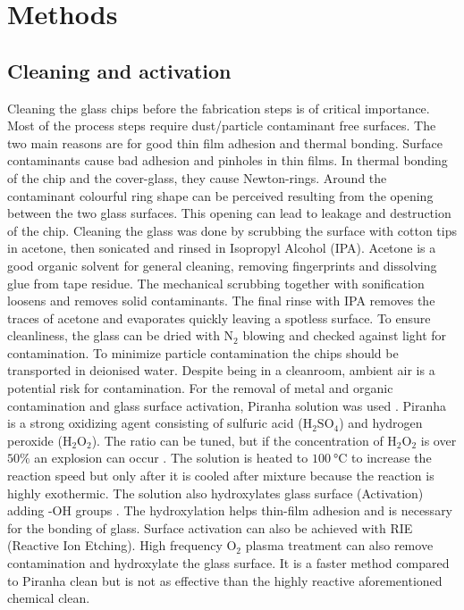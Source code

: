 \documentclass[final]{jyflluk}
\begin{document}
\section{Methods}
\label{sec:methods}

\subsection{Cleaning and activation}
\label{sec:xx1}

Cleaning the glass chips before the fabrication steps is of critical importance. Most of the process steps require dust/particle contaminant free surfaces. The two main reasons are for good thin film adhesion and thermal bonding. Surface contaminants cause bad adhesion and pinholes in thin films. In thermal bonding of the chip and the cover-glass, they cause Newton-rings. Around the contaminant colourful ring shape can be perceived resulting from the opening between the two glass surfaces. This opening can lead to leakage and destruction of the chip.
Cleaning the glass was done by scrubbing the surface with cotton tips in acetone, then sonicated and rinsed in Isopropyl Alcohol (IPA). Acetone is a good organic solvent for general cleaning, removing fingerprints and dissolving glue from tape residue. The mechanical scrubbing together with sonification loosens and removes solid contaminants. The final rinse with IPA removes the traces of acetone and evaporates quickly leaving a spotless surface. To ensure cleanliness, the glass can be dried with $\mathrm{N_2}$ blowing and checked against light for contamination.  To minimize particle contamination the chips should be transported in deionised water. Despite being in a cleanroom, ambient air is a potential risk for contamination. 
For the removal of metal and organic contamination and glass surface activation, Piranha solution was used \cite{franssila2010introduction}. Piranha is a strong oxidizing agent consisting of sulfuric acid ($\mathrm{H_2 SO_4}$) and hydrogen peroxide ($\mathrm{H_2 O_2}$). The ratio can be tuned, but if the concentration of $\mathrm{H_2 O_2}$ is over $50 \percent$ an explosion can occur \cite{piranha2014}. The solution is heated to $\SI{100}{\celsius}$ to increase the reaction speed but only after it is cooled after mixture because the reaction is highly exothermic. The solution also hydroxylates glass surface (Activation) adding -OH groups \cite{klug2013chemical}. The hydroxylation helps thin-film adhesion and is necessary for the bonding of glass. Surface activation can also be achieved with RIE (Reactive Ion Etching)\cite{lazauskas2012float}. High frequency $\mathrm{O_2}$ plasma treatment can also remove contamination and  hydroxylate the glass surface. It is a faster method compared to Piranha clean but is not as effective than the highly reactive aforementioned chemical clean.
\end{document}
